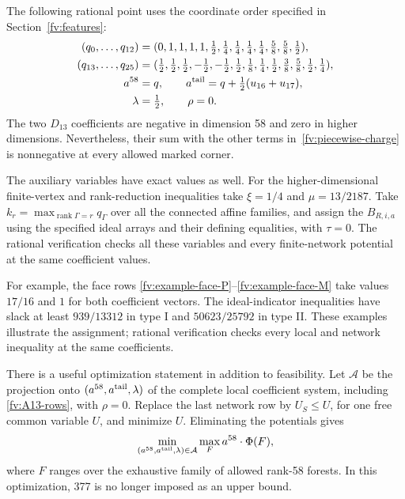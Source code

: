 \documentclass[11pt]{article}
\theoremstyle{definition}
\theoremstyle{remark}
\numberwithin{equation}{section}
\begin{document}
The following rational point uses the coordinate order specified in
Section~\ref{fv:features}:
\begin{align}
 (q_0,\ldots,q_{12})={}&
 (0,1,1,1,1,\tfrac12,\tfrac14,\tfrac14,\tfrac14,\tfrac14,
       \tfrac58,\tfrac58,\tfrac12),\notag\\
 (q_{13},\ldots,q_{25})={}&
 (\tfrac12,\tfrac12,\tfrac12,-\tfrac12,-\tfrac12,\tfrac12,
       \tfrac18,\tfrac14,\tfrac12,\tfrac38,\tfrac58,\tfrac12,
       \tfrac14),\notag\\
 a^{58}={}&q,\qquad
 a^{\rm tail}=q+\tfrac12(u_{16}+u_{17}),\notag\\
 \lambda={}&\tfrac12,\qquad\rho=0.
 \label{fv:successful-law}
\end{align}
The two $D_{13}$ coefficients are negative in dimension 58 and zero
in higher dimensions. Nevertheless, their sum with the other terms
in~\eqref{fv:piecewise-charge} is nonnegative at every allowed
marked corner.

The auxiliary variables have exact values as well. For the
higher-dimensional finite-vertex and rank-reduction inequalities take
$\xi=1/4$ and $\mu=13/2187$. Take
$k_r=\max_{\operatorname{rank}\Gamma=r}q_\Gamma$ over all the
connected affine families, and assign the $B_{R,i,a}$ using the
specified ideal arrays and their defining equalities, with $\tau=0$.
The rational verification checks all these variables and every
finite-network potential at the same coefficient values.

For example, the face rows
\eqref{fv:example-face-P}--\eqref{fv:example-face-M} take values
$17/16$ and $1$ for both coefficient vectors. The ideal-indicator inequalities have slack
at least $939/13312$ in type I and $50623/25792$ in type II. These
examples illustrate the assignment; rational verification checks
every local and network inequality at the same coefficients.

There is a useful optimization statement in addition to feasibility.
Let $\mathcal A$ be the projection onto
$(a^{58},a^{\rm tail},\lambda)$ of the complete local coefficient
system, including \eqref{fv:A13-rows}, with $\rho=0$. Replace the
last network row by $U_S\le U$, for one free common variable $U$,
and minimize $U$. Eliminating the potentials gives
\begin{equation}\label{fv:minimax}
 \min_{(a^{58},a^{\rm tail},\lambda)\in\mathcal A}
                 \max_F a^{58}\cdot\Phi(F),
\end{equation}
where $F$ ranges over the exhaustive family of allowed rank-58
forests. In this optimization, 377 is no longer imposed as an upper
bound.
\end{document}
